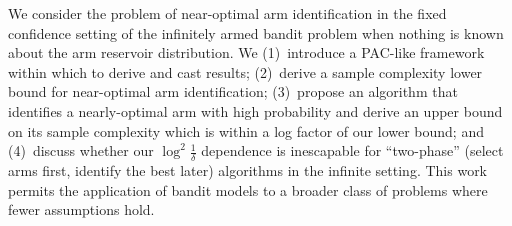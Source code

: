 







We consider the problem of near-optimal arm identification in the fixed confidence setting of the infinitely armed bandit problem
when nothing is known about the arm reservoir distribution.
We 
(1)~introduce a PAC-like framework
within which to derive and cast results;
(2)~derive a sample complexity lower bound for near-optimal arm
identification;
(3)~propose an algorithm that identifies a nearly-optimal arm with high probability
and derive an upper bound on its sample complexity which is within a log factor of our
lower bound; and
(4)~discuss whether our $\log^2 \frac{1}{\delta}$ dependence is inescapable for ``two-phase'' (select arms first, identify the best later) algorithms in the infinite setting.
This work permits the application of bandit models to a broader class of
problems where fewer assumptions hold.



